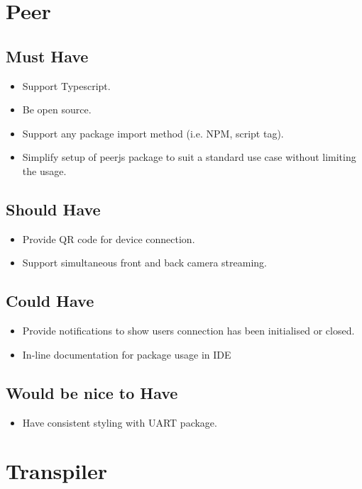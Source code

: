 \documentclass{l4proj}
\begin{document}
\begin{appendices}

\section{Peer}
\subsection{Must Have}
\begin{itemize}
    \item Support Typescript.
    \item Be open source.
    \item Support any package import method (i.e. NPM, script tag).
    \item Simplify setup of peerjs package to suit a standard use case without limiting the usage.

\end{itemize}
\subsection{Should Have}
\begin{itemize}
    \item Provide QR code for device connection.
    \item Support simultaneous front and back camera streaming.

\end{itemize}
\subsection{Could Have}
\begin{itemize}
    \item Provide notifications to show users connection has been initialised or closed.
    \item In-line documentation for package usage in IDE

\end{itemize}
\subsection{Would be nice to Have}
\begin{itemize}
    \item Have consistent styling with UART package.
\end{itemize}


\section{Transpiler}

\end{appendices}
\end{document}
